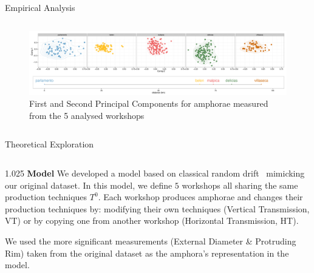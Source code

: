 \documentclass[final]{beamer}
\newlength{\onecolwid}
\newlength{\twocolwid}
\begin{document}
\begin{frame}[t]
\begin{columns}[t]
\begin{column}{\twocolwid}
\begin{block}{Empirical Analysis}
\begin{columns}[t,totalwidth=\twocolwid]
\begin{column}{\twocolwid} %
\begin{figure}
\includegraphics[width=0.65\linewidth]{images/fig2.pdf}
\singlespace
\caption{First and Second Principal Components for amphorae measured from the 5 analysed workshops}
\label{fig:pca}
\end{figure}
\end{column}
\end{columns}
\end{block}
\vspace{-1cm}
\begin{block}{Theoretical Exploration}

\begin{columns}[t,totalwidth=\twocolwid]

\begin{column}{1.025\onecolwid} %
{\textbf{Model}}
\justify
We developed a model based on classical random drift~\cite{bentley2004randomdriftandculturechange} mimicking our original dataset. In this model, we define $5$ workshops all sharing the same production techniques $T^{0}$. 
Each workshop produces amphorae and changes their production techniques by: modifying their own techniques (Vertical Transmission, VT) or by copying one from another workshop (Horizontal Transmission, HT). 

We used the more significant measurements (External Diameter \& Protruding Rim) taken from the original dataset as the amphora's representation in the model.

\vspace{1cm}



\end{column}
\end{columns}
\end{block}
\end{column}
\end{columns}
\end{frame}
\end{document}
